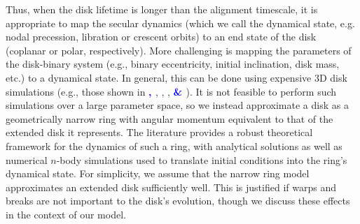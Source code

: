 \documentclass[twocolumn,linenumbers]{aastex631}
\newcommand{\RGM}[1]{\textcolor{cyan}{#1}}
\newcommand{\RR}[1]{\textcolor{blue}{\bf#1}} %
\newcommand{\RP}[1]{\RR{#1}} %
\begin{document}
Thus, when the disk lifetime is longer than the alignment timescale, it is appropriate to map the secular dynamics (which we call the dynamical state, e.g. nodal precession, libration or crescent orbits) to an end state of the disk (coplanar or polar, respectively). More challenging is mapping the parameters of the disk-binary system (e.g., binary eccentricity, initial inclination, disk mass, etc.) to a dynamical state. In general, this can be done using expensive 3D disk simulations (e.g., those shown in \RR{\citealt{aly2015}, \citealt{cuello2019}} \citealt{martin2019}, \citealt{smallwood2019}, \citealt{abod2022}, \RR{\citealt{young2023} \& \citealt{ceppi2023}}). It is not feasible to perform such simulations over a large parameter space, so we instead approximate a disk as a geometrically narrow ring with angular momentum equivalent to that of the extended disk it represents. The literature provides a robust theoretical framework for the dynamics of such a ring, with analytical solutions \citep{farago2010,zanazzi2018,martin2019} as well as numerical $n$-body simulations \citep{abod2022,lepp2022} used to translate initial conditions into the ring's dynamical state. For simplicity, we assume that the narrow ring model approximates an extended disk sufficiently well. This is justified if warps and breaks are not important to the disk's evolution, though we discuss these effects in the context of our model.

\end{document}
